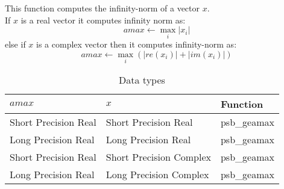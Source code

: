 This function computes 
 the infinity-norm of a vector $x$.\\
If $x$ is a real  vector
it computes infinity norm as:
\[ amax \leftarrow \max_i |x_i|\]
else if $x$ is a complex vector then it computes infinity-norm  as:
\[ amax \leftarrow \max_i {(|re(x_i)| + |im(x_i)|)}\]


\begin{table}[h]
\begin{center}
\begin{tabular}{lll}
\hline
$amax$ & $x$ & {\bf Function}\\
\hline
Short Precision Real& Short Precision Real & psb\_geamax \\
Long Precision Real&Long Precision Real & psb\_geamax \\
Short Precision Real&Short Precision Complex & psb\_geamax \\
Long Precision Real&Long Precision Complex & psb\_geamax \\
\hline
\end{tabular}
\end{center}
\caption{Data types\label{tab:f90amax}}
\end{table}


